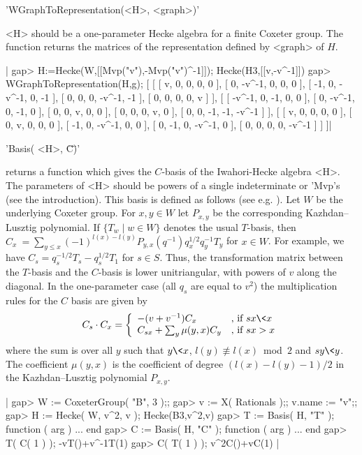 'WGraphToRepresentation(<H>, <graph>)'

<H> should be a one-parameter Hecke algebra for a finite Coxeter group. The
function  returns the matrices of the  representation defined by <graph> of
$H$.

|    gap> H:=Hecke(W,[[Mvp("v"),-Mvp("v")^-1]]);
    Hecke(H3,[[v,-v^-1]])
    gap> WGraphToRepresentation(H,g);
    [ [ [ v, 0, 0, 0, 0 ], [ 0, -v^-1, 0, 0, 0 ], [ -1, 0, -v^-1, 0, -1 ], 
      [ 0, 0, 0, -v^-1, -1 ], [ 0, 0, 0, 0, v ] ], 
    [ [ -v^-1, 0, -1, 0, 0 ], [ 0, -v^-1, 0, -1, 0 ], [ 0, 0, v, 0, 0 ], 
        [ 0, 0, 0, v, 0 ], [ 0, 0, -1, -1, -v^-1 ] ], 
    [ [ v, 0, 0, 0, 0 ], [ 0, v, 0, 0, 0 ], [ -1, 0, -v^-1, 0, 0 ], 
        [ 0, -1, 0, -v^-1, 0 ], [ 0, 0, 0, 0, -v^-1 ] ] ]|


'Basis( <H>, \"C\" )'

returns  a function which gives the  $C$-basis of the Iwahori-Hecke algebra
<H>.  The parameters of <H>  should be powers of  a single indeterminate or
'Mvp's  (see the introduction). This basis  is defined as follows (see e.g.
\cite[(5.1)]{Lus85}). Let $W$ be the underlying Coxeter group. For $x,y \in
W$  let  $P_{x,y}$  be  the  corresponding  Kazhdan--Lusztig polynomial. If
$\{T_w  \mid w\in W\}$ denotes the usual $T$-basis, then $C_x\:=\sum_{y \le
x} (-1)^{l(x)-l(y)}P_{y,x}(q^{-1})q_x^{1/2}q_y^{-1} T_y$ for $x \in W$. For
example,  we have $C_s=q_s^{-1/2}T_s-q_s^{1/2}T_1$ for $s \in S$. Thus, the
transformation  matrix  between  the  $T$-basis  and the $C$-basis is lower
unitriangular,  with powers of $v$ along the diagonal. In the one-parameter
case  (all $q_s$ are equal  to $v^2$) the multiplication  rules for the $C$
basis   are  given  by\:  $$   C_s  \cdot  C_x  =\left\{  \begin{array}{ll}
-(v+v^{-1})C_x  &  \mbox{,  if  $sx\<x$}\\  C_{sx}+\sum_{y}  \mu(y,x)C_y  &
\mbox{,  if $sx>x$}\end{array}\right.$$ where the sum  is over all $y$ such
that  $y\<x$, $l(y)  \not\equiv l(x)$~mod~$2$  and $sy\<y$. The coefficient
$\mu(y,x)$   is  the   coefficient  of   degree  $(l(x)-l(y)-1)/2$  in  the
Kazhdan--Lusztig polynomial $P_{x,y}$.

|    gap> W := CoxeterGroup( "B", 3 );;
    gap> v := X( Rationals );; v.name := "v";;
    gap> H := Hecke( W, v^2, v );
    Hecke(B3,v^2,v)
    gap> T := Basis( H, "T" );
    function ( arg ) ... end
    gap> C := Basis( H, "C" );
    function ( arg ) ... end
    gap> T( C( 1 ) );
    -vT()+v^-1T(1)
    gap> C( T( 1 ) );
    v^2C()+vC(1) |

